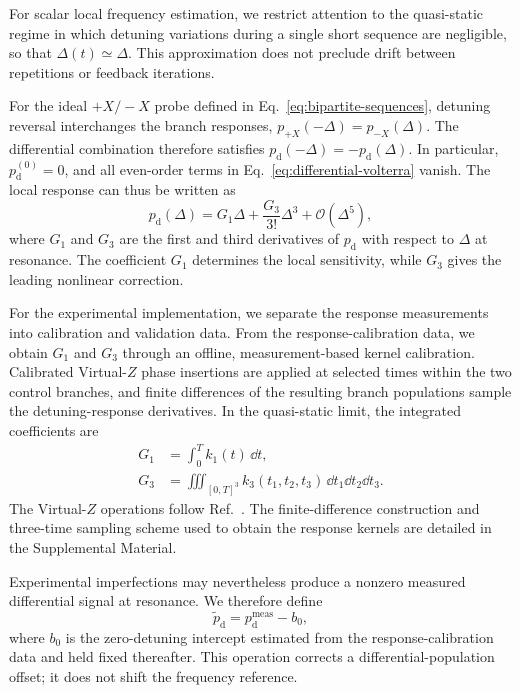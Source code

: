 For scalar local frequency estimation, we restrict attention to the
quasi-static regime in which detuning variations during a single short
sequence are negligible, so that $\Delta(t)\simeq\Delta$. This approximation
does not preclude drift between repetitions or feedback iterations.

For the ideal $+X/-X$ probe defined in
Eq.~\eqref{eq:bipartite-sequences}, detuning reversal interchanges the branch
responses,
$p_{+X}(-\Delta)=p_{-X}(\Delta)$. The differential combination therefore
satisfies $p_{\mathrm d}(-\Delta)=-p_{\mathrm d}(\Delta)$. In particular,
$p_{\mathrm d}^{(0)}=0$, and all even-order terms in
Eq.~\eqref{eq:differential-volterra} vanish. The local response can thus be
written as
%
\begin{equation}
p_{\mathrm d}(\Delta)
=
G_1\Delta
+
\frac{G_3}{3!}\Delta^3
+
\mathcal O(\Delta^5),
\label{eq:short-pulse-cubic-response}
\end{equation}
%
where $G_1$ and $G_3$ are the first and third derivatives of
$p_{\mathrm d}$ with respect to $\Delta$ at resonance. The coefficient
$G_1$ determines the local sensitivity, while $G_3$ gives the leading
nonlinear correction.

For the experimental implementation, we separate the response measurements
into calibration and validation data. From the response-calibration data, we
obtain $G_1$ and $G_3$ through an offline, measurement-based kernel
calibration. Calibrated Virtual-$Z$ phase insertions are applied at selected
times within the two control branches, and finite differences of the
resulting branch populations sample the detuning-response derivatives. In
the quasi-static limit, the integrated coefficients are
%
\begin{equation}
\begin{aligned}
G_1
&=
\int_0^T k_1(t)\,\dd t,
\\
G_3
&=
\iiint_{[0,T]^3}
k_3(t_1,t_2,t_3)\,
\dd t_1\dd t_2\dd t_3 .
\end{aligned}
\label{eq:g1-g3}
\end{equation}
%
The Virtual-$Z$ operations follow
Ref.~\cite{mckay2017efficient}. The finite-difference construction and
three-time sampling scheme used to obtain the response kernels are detailed
in the Supplemental Material.

Experimental imperfections may nevertheless produce a nonzero measured
differential signal at resonance. We therefore define
%
\begin{equation}
\widetilde p_{\mathrm d}
=
p_{\mathrm d}^{\mathrm{meas}}-b_0,
\label{eq:corrected-differential-response}
\end{equation}
%
where $b_0$ is the zero-detuning intercept estimated from the
response-calibration data and held fixed thereafter. This operation corrects
a differential-population offset; it does not shift the frequency reference.

